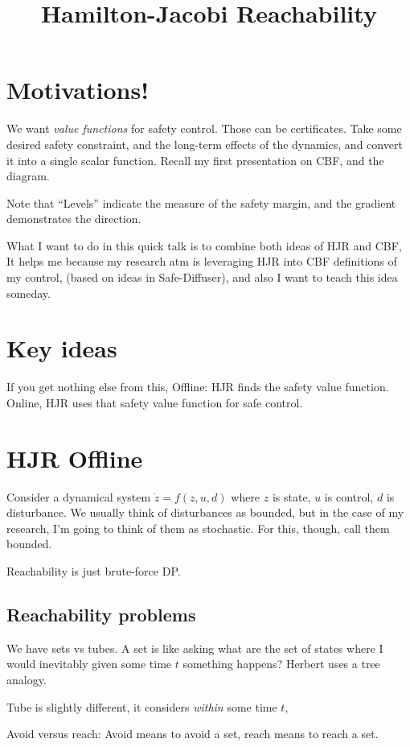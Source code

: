\documentclass{article}
\title{Hamilton-Jacobi Reachability}
\author{}
\date{}
\begin{document}
\maketitle


\section{Motivations!}
We want \textit{value functions} for safety control. Those can be certificates. Take some desired safety constraint, and the long-term effects of the dynamics, and convert it into a single scalar function. Recall my first presentation on CBF, and the diagram. 

Note that ``Levels'' indicate the measure of the safety margin, and the gradient demonstrates the direction. 

What I want to do in this quick talk is to combine both ideas of HJR and CBF, It helps me because my research atm is leveraging HJR into CBF definitions of my control, (based on ideas in Safe-Diffuser), and also I want to teach this idea someday. 

\section{Key ideas}
If you get nothing else from this, Offline: HJR finds the safety value function. Online, HJR uses that safety value function for safe control.

\section{HJR Offline}
Consider a dynamical system $\dot z = f(z, u, d)$ where $z$ is state, $u$ is control, $d$ is disturbance. We usually think of disturbances as bounded, but in the case of my research, I'm going to think of them as stochastic. For this, though, call them bounded.

Reachability is just brute-force DP.

\subsection{Reachability problems}
We have sets vs tubes. A set is like asking what are the set of states where I would inevitably given some time $t$ something happens? Herbert uses a tree analogy.

Tube is slightly different, it considers \textit{within} some time $t$, 

Avoid versus reach:
Avoid means to avoid a set, reach means to reach a set.
\end{document}
